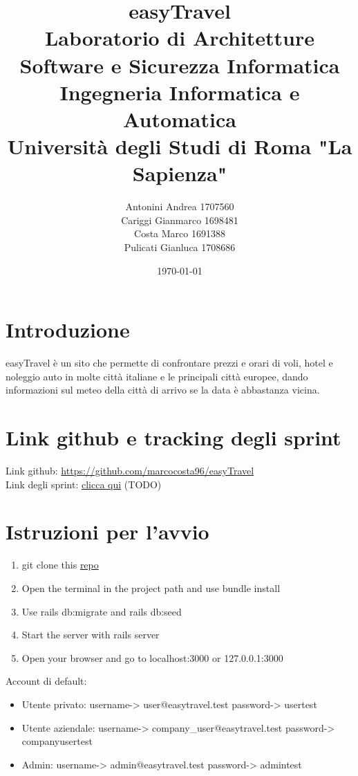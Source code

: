 \documentclass[11pt]{article}
\title{\textbf{easyTravel} \\ \bigskip \large Laboratorio di Architetture Software e Sicurezza Informatica \\ Ingegneria Informatica e Automatica \\ Università degli Studi di Roma "La Sapienza"}
\author{Antonini Andrea 1707560\\Cariggi Gianmarco 1698481\\Costa Marco 1691388\\Pulicati Gianluca 1708686}
\date{\today}
\begin{document}
\maketitle

\pagebreak

\tableofcontents

\pagebreak

\section{Introduzione}

easyTravel è un sito che permette di confrontare prezzi e orari di voli, hotel e noleggio auto in molte
città italiane e le principali città europee, dando informazioni sul meteo della città di arrivo se la data è abbastanza vicina.


\section{Link github e tracking degli sprint}

Link github: \href{https://github.com/marcocosta96/easyTravel}{https://github.com/marcocosta96/easyTravel} \\
Link degli sprint: \href{https://docs.google.com/spreadsheets/d/14VnUUgNbMTW1_EG6KlEAEggAsf6aBKnaC1etXz5ji0I/edit#gid=12}{clicca qui} (TODO) %


\section{Istruzioni per l'avvio}

\begin{enumerate}
	\item git clone this \href{https://github.com/marcocosta96/easyTravel}{repo}
	\item Open the terminal in the project path and use bundle install
	\item Use rails db:migrate and rails db:seed
	\item Start the server with rails server
	\item Open your browser and go to localhost:3000 or 127.0.0.1:3000
\end{enumerate}

Account di default:
\begin{itemize}
	\item Utente privato: username-> user@easytravel.test password-> usertest
	\item Utente aziendale: username-> company\_user@easytravel.test password-> companyusertest
	\item Admin: username-> admin@easytravel.test password-> admintest
\end{itemize}
\end{document}
